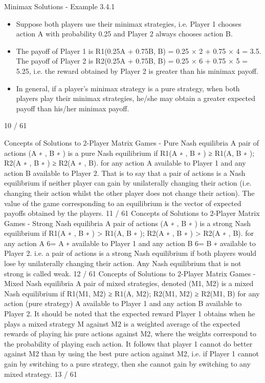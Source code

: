 Minimax Solutions - Example 3.4.1
\begin{itemize}
\item Suppose both players use their minimax strategies, i.e. Player 1
chooses action A with probability 0.25 and Player 2 always chooses
action B.
\item The payoff of Player 1 is
R1(0.25A + 0.75B, B) = 0.25 × 2 + 0.75 × 4 = 3.5.
The payoff of Player 2 is
R2(0.25A + 0.75B, B) = 0.25 × 6 + 0.75 × 5 = 5.25, i.e. the
reward obtained by Player 2 is greater than his minimax payoff.
\item In general, if a player’s minimax strategy is a pure strategy, when
both players play their minimax strategies, he/she may obtain a
greater expected payoff than his/her minimax payoff.
\end{itemize}
10 / 61

Concepts of Solutions to 2-Player Matrix Games - Pure
Nash equilibria
A pair of actions (A
∗
, B
∗
) is a pure Nash equilibrium if
R1(A
∗
, B
∗
) ≥ R1(A, B
∗
); R2(A
∗
, B
∗
) ≥ R2(A
∗
, B).
for any action A available to Player 1 and any action B available
to Player 2.
That is to say that a pair of actions is a Nash equilibrium if neither
player can gain by unilaterally changing their action (i.e. changing
their action whilst the other player does not change their action).
The value of the game corresponding to an equilibrium is the
vector of expected payoffs obtained by the players.
11 / 61
Concepts of Solutions to 2-Player Matrix Games - Strong
Nash equilibria
A pair of actions (A
∗
, B
∗
) is a strong Nash equilibrium if
R1(A
∗
, B
∗
) > R1(A, B
∗
); R2(A
∗
, B
∗
) > R2(A
∗
, B).
for any action A 6= A
∗
available to Player 1 and any action B 6= B
∗
available to Player 2.
i.e. a pair of actions is a strong Nash equilibrium if both players
would lose by unilaterally changing their action.
Any Nash equilibrium that is not strong is called weak.
12 / 61
Concepts of Solutions to 2-Player Matrix Games - Mixed
Nash equilibria
A pair of mixed strategies, denoted (M1, M2) is a mixed Nash
equilibrium if
R1(M1, M2) ≥ R1(A, M2); R2(M1, M2) ≥ R2(M1, B)
for any action (pure strategy) A available to Player 1 and any
action B available to Player 2.
It should be noted that the expected reward Player 1 obtains when
he plays a mixed strategy M against M2 is a weighted average of
the expected rewards of playing his pure actions against M2, where
the weights correspond to the probability of playing each action.
It follows that player 1 cannot do better against M2 than by using
the best pure action against M2, i.e. if Player 1 cannot gain by
switching to a pure strategy, then she cannot gain by switching to
any mixed strategy.
13 / 61

